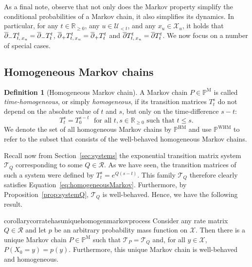 \documentclass[10pt,a4paper]{paper}
\theoremstyle{definition}
\newtheorem{definition}{Definition}
\newcommand{\reals}{\mathbb{R}}
\newcommand{\realsnonneg}{\reals_{\geq 0}}
\newcommand{\states}{\mathcal{X}}
\newcommand{\processes}{\mathbb{P}}
\newcommand{\mprocesses}{\processes^{\mathrm{M}}}
\newcommand{\hmprocesses}{\processes^{\mathrm{HM}}}
\newcommand{\whmprocesses}{\processes^{\mathrm{WHM}}}
\begin{document}
As a final note, observe that not only does the Markov property simplify the conditional probabilities of a Markov chain, it also simplifies its dynamics. In particular, for any $t\in\realsnonneg$, any $u\in\mathcal{U}_{<t}$, and any $x_u\in\states_u$, it holds that $\smash{\overline{\partial}_-}T_{t,\,x_u}^t=\smash{\overline{\partial}_-}T_{t}^t$, $\smash{\overline{\partial}_+}T_{t,\,x_u}^t=\smash{\overline{\partial}_+}T_{t}^t$ and $\smash{\overline{\partial}}T_{t,\,x_u}^t=\smash{\overline{\partial}}T_{t}^t$. We now focus on a number of special cases.

\subsection{Homogeneous Markov chains}\label{sec:homogen_markov_chain}

\begin{definition}[Homogeneous Markov chain]\label{def:homogeneousMarkov}
A Markov chain $P\in\mprocesses$ is called \emph{time-homogeneous}, or simply \emph{homogeneous}, if its transition matrices $T_t^s$ do not depend on the absolute value of $t$ and $s$, but only on the time-difference $s-t$:
\begin{equation}\label{eq:homogeneousMarkov}
T_t^s=T_0^{s-t}
\text{~~for all $t,s\in\realsnonneg$ such that $t\leq s$.}
\end{equation}
We denote the set of all homogeneous Markov chains by $\hmprocesses$ and use $\whmprocesses$ to refer to the subset that consists of the well-behaved homogeneous Markov chains.
\end{definition}

Recall now from Section~\ref{sec:systems} the exponential transition matrix system $\mathcal{T}_Q$ corresponding to some $Q\in\mathcal{R}$. As we have seen, the transition matrices of such a system were defined by $T_t^s = e^{Q(s-t)}$. This family $\mathcal{T}_Q$ therefore clearly satisfies Equation~\eqref{eq:homogeneousMarkov}. Furthermore, by Proposition~\ref{prop:systemQ}, $\mathcal{T}_Q$ is well-behaved. Hence, we have the following result.

\begin{restatable}{corollary}{corratehasuniquehomogenmarkovprocess}
\label{cor:rate_has_unique_homogen_markov_process}
Consider any rate matrix $Q\in\mathcal{R}$ and let $p$ be an arbitrary probability mass function on $\states$. Then there is a unique Markov chain $P\in\mprocesses$ such that $\mathcal{T}_P=\mathcal{T}_Q$ and, for all $y\in\mathcal{X}$, $P(X_0=y)=p(y)$. Furthermore, this unique Markov chain is well-behaved and homogeneous.
\end{restatable}
\end{document}

